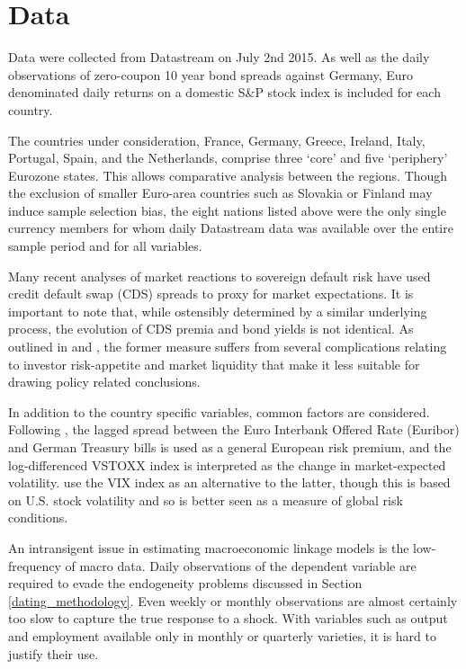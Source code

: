\documentclass[/../base.tex]{subfiles}
\begin{document}
\section{Data}
\label{data}

Data were collected from Datastream on July 2nd 2015. As well as the daily observations of zero-coupon 10 year bond spreads against Germany, Euro denominated daily returns on a domestic S\&P stock index is included for each country.

The countries under consideration, France, Germany, Greece, Ireland, Italy, Portugal, Spain, and the Netherlands, comprise three `core' and five `periphery' Eurozone states. This allows comparative analysis between the regions. Though the exclusion of smaller Euro-area countries such as Slovakia or Finland may induce sample selection bias, the eight nations listed above were the only single currency members for whom daily Datastream data was available over the entire sample period and for all variables. 

Many recent analyses of market reactions to sovereign default risk have used credit default swap (CDS) spreads to proxy for market expectations. It is important to note that, while ostensibly determined by a similar underlying process, the evolution of CDS premia and bond yields is not identical. As outlined in  \cite{fontana2010analysis} and \cite{beirne2013pricing}, the former measure suffers from several complications relating to investor risk-appetite and market liquidity that make it less suitable for drawing policy related conclusions.

In addition to the country specific variables, common factors are considered. Following \cite{metiu2012sovereign}, the lagged spread between the Euro Interbank Offered Rate (Euribor) and German Treasury bills is used as a general European risk premium, and the log-differenced VSTOXX index is interpreted as the change in market-expected volatility. \cite{giordano2013pure} use the VIX index as an alternative to the latter, though this is based on U.S. stock volatility and so is better seen as a measure of global risk conditions. 



An intransigent issue in estimating macroeconomic linkage models is the low-frequency of macro data. Daily observations of the dependent variable are required to evade the endogeneity problems discussed in Section \ref{dating_methodology}. Even weekly or monthly observations are almost certainly too slow to capture the true response to a shock. With variables such as output and employment available only in monthly or quarterly varieties, it is hard to justify their use.
\end{document}
